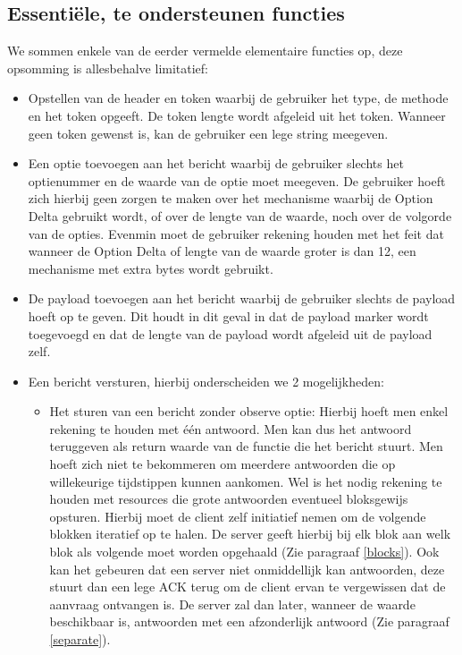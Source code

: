 \subsection{Essenti\"{e}le, te ondersteunen functies} \label{essentielefuncties}

We sommen enkele van de eerder vermelde elementaire functies op, deze opsomming is allesbehalve limitatief:

\begin{itemize}
\item Opstellen van de header en token waarbij de gebruiker het type, de methode en het token opgeeft. De token lengte wordt afgeleid uit het token. Wanneer geen token gewenst is, kan de gebruiker een lege string meegeven.
\item Een optie toevoegen aan het bericht waarbij de gebruiker slechts het optienummer en de waarde van de optie moet meegeven. De gebruiker hoeft zich hierbij geen zorgen te maken over het mechanisme waarbij de Option Delta gebruikt wordt, of over de lengte van de waarde, noch over de volgorde van de opties. Evenmin moet de gebruiker rekening houden met het feit dat wanneer de Option Delta of lengte van de waarde groter is dan 12, een mechanisme met extra bytes wordt gebruikt.
\item De payload toevoegen aan het bericht waarbij de gebruiker slechts de payload hoeft op te geven.  Dit houdt in dit geval in dat de payload marker wordt toegevoegd en dat de lengte van de payload wordt afgeleid uit de payload zelf.
\item Een bericht versturen, hierbij onderscheiden we 2 mogelijkheden:
\begin{itemize}
\item Het sturen van een bericht zonder observe optie: Hierbij hoeft men enkel rekening te houden met \'{e}\'{e}n antwoord. Men kan dus het antwoord teruggeven als return waarde van de functie die het bericht stuurt. Men hoeft zich niet te bekommeren om meerdere antwoorden die op willekeurige tijdstippen kunnen aankomen. Wel is het nodig rekening te houden met resources die grote antwoorden eventueel bloksgewijs opsturen. Hierbij moet de client zelf initiatief nemen om de volgende blokken iteratief op te halen. De server geeft hierbij bij elk blok aan welk blok als volgende moet worden opgehaald (Zie paragraaf \ref{blocks}). Ook kan het gebeuren dat een server niet onmiddellijk kan antwoorden, deze stuurt dan een lege ACK terug om de client ervan te vergewissen dat de aanvraag ontvangen is. De server zal dan later, wanneer de waarde beschikbaar is, antwoorden met een afzonderlijk antwoord (Zie paragraaf \ref{separate}).

\end{itemize}
\end{itemize}
